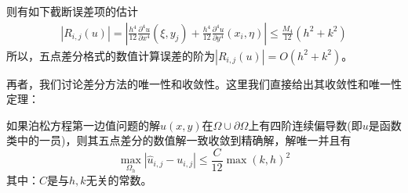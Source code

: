             则有如下截断误差项的估计
            \begin{align*}
                |R_{i,j}(u)| = \left|  \frac{h^4}{12} \frac{\partial^4 u}{\partial x^4}(\xi,y_j) + \frac{h^4}{12} \frac{\partial^4 u}{\partial y^4}(x_i,\eta) \right| \leqslant \frac{M_4}{12} (h^2+k^2)
            \end{align*}
            所以，五点差分格式的数值计算误差的阶为$|R_{i,j}(u)| = O(h^2+k^2)$。
            \par
            再者，我们讨论差分方法的唯一性和收敛性。这里我们直接给出其收敛性和唯一性定理：
            \begin{theorem}[差分法的收敛性]
            如果泊松方程第一边值问题的解$u(x,y)$在$\Omega \cup \partial \Omega$上有四阶连续偏导数(即$u$是函数类中的一员)，则其五点差分的数值解一致收敛到精确解，解唯一并且有
            \[
                \max_{\Omega_h} |\hat{u}_{i,j} - u_{i,j}| \leqslant \frac{C}{12} \max(k,h)^2
            \]
            其中：$C$是与$h,k$无关的常数。
            \end{theorem}

